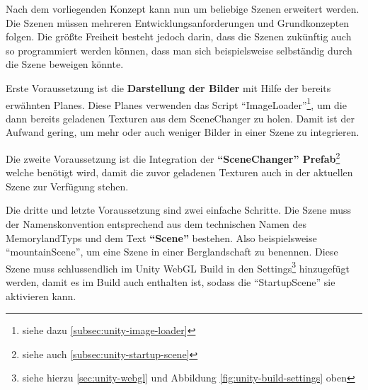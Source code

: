 Nach dem vorliegenden Konzept kann nun um beliebige Szenen erweitert werden. Die Szenen müssen mehreren Entwicklungsanforderungen und Grundkonzepten folgen. Die größte Freiheit besteht jedoch darin, dass die Szenen zukünftig auch so programmiert werden können, dass man sich beispielsweise selbständig durch die Szene beweigen könnte.

Erste Voraussetzung ist die \textbf{Darstellung der Bilder} mit Hilfe der bereits erwähnten Planes. Diese Planes verwenden das Script ``ImageLoader''\footnote{siehe dazu \ref{subsec:unity-image-loader}}, um die dann bereits geladenen Texturen aus dem SceneChanger zu holen. Damit ist der Aufwand gering, um mehr oder auch weniger Bilder in einer Szene zu integrieren.

Die zweite Voraussetzung ist die Integration der \textbf{``SceneChanger'' Prefab}\footnote{siehe auch \ref{subsec:unity-startup-scene}} welche benötigt wird, damit die zuvor geladenen Texturen auch in der aktuellen Szene zur Verfügung stehen.

Die dritte und letzte Voraussetzung sind zwei einfache Schritte. Die Szene muss der Namenskonvention entsprechend aus dem technischen Namen des MemorylandTyps und dem Text \textbf{``Scene''} bestehen. Also beispielsweise ``mountainScene'', um eine Szene in einer Berglandschaft zu benennen. Diese Szene muss schlussendlich im Unity WebGL Build in den Settings\footnote{siehe hierzu \ref{sec:unity-webgl} und Abbildung \ref{fig:unity-build-settings} oben} hinzugefügt werden, damit es im Build auch enthalten ist, sodass die ``StartupScene'' sie aktivieren kann.


